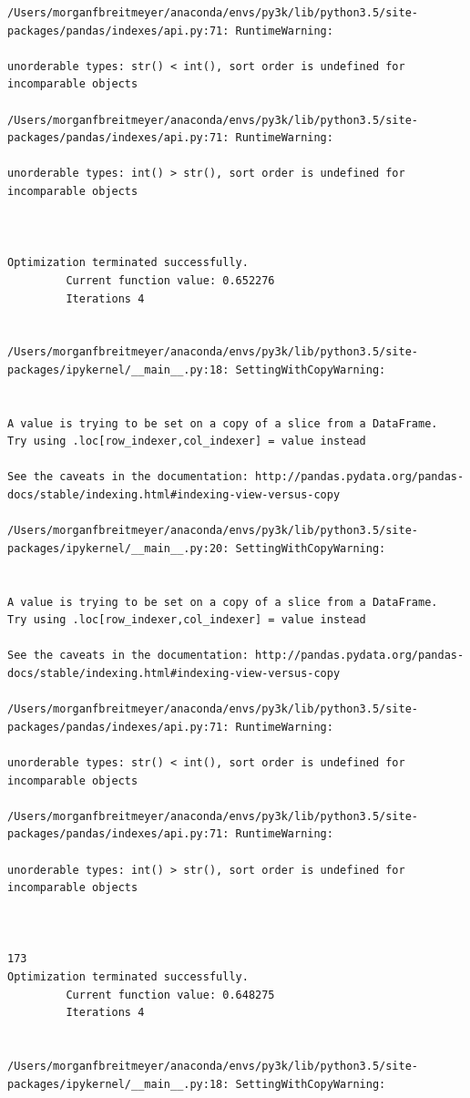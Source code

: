 \begin{lstlisting}
/Users/morganfbreitmeyer/anaconda/envs/py3k/lib/python3.5/site-packages/pandas/indexes/api.py:71: RuntimeWarning:

unorderable types: str() < int(), sort order is undefined for incomparable objects

/Users/morganfbreitmeyer/anaconda/envs/py3k/lib/python3.5/site-packages/pandas/indexes/api.py:71: RuntimeWarning:

unorderable types: int() > str(), sort order is undefined for incomparable objects



Optimization terminated successfully.
         Current function value: 0.652276
         Iterations 4


/Users/morganfbreitmeyer/anaconda/envs/py3k/lib/python3.5/site-packages/ipykernel/__main__.py:18: SettingWithCopyWarning:


A value is trying to be set on a copy of a slice from a DataFrame.
Try using .loc[row_indexer,col_indexer] = value instead

See the caveats in the documentation: http://pandas.pydata.org/pandas-docs/stable/indexing.html#indexing-view-versus-copy

/Users/morganfbreitmeyer/anaconda/envs/py3k/lib/python3.5/site-packages/ipykernel/__main__.py:20: SettingWithCopyWarning:


A value is trying to be set on a copy of a slice from a DataFrame.
Try using .loc[row_indexer,col_indexer] = value instead

See the caveats in the documentation: http://pandas.pydata.org/pandas-docs/stable/indexing.html#indexing-view-versus-copy

/Users/morganfbreitmeyer/anaconda/envs/py3k/lib/python3.5/site-packages/pandas/indexes/api.py:71: RuntimeWarning:

unorderable types: str() < int(), sort order is undefined for incomparable objects

/Users/morganfbreitmeyer/anaconda/envs/py3k/lib/python3.5/site-packages/pandas/indexes/api.py:71: RuntimeWarning:

unorderable types: int() > str(), sort order is undefined for incomparable objects



173
Optimization terminated successfully.
         Current function value: 0.648275
         Iterations 4


/Users/morganfbreitmeyer/anaconda/envs/py3k/lib/python3.5/site-packages/ipykernel/__main__.py:18: SettingWithCopyWarning:



\end{lstlisting}
